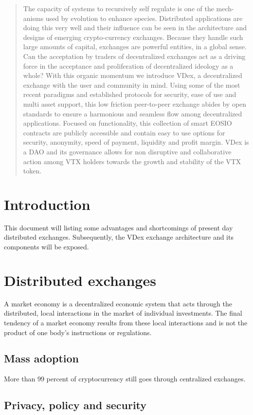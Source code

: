 \documentclass[]{article}
\begin{document}
\begin{abstract}
The capacity of systems to recursively self regulate is one of the mech-
anisms used by evolution to enhance species. Distributed applications are
doing this very well and their influence can be seen in the architecture
and designs of emerging crypto-currency exchanges. Because they handle
such large amounts of capital, exchanges are powerful entities, in a global
sense. Can the acceptation by traders of decentralized exchanges act as a
driving force in the acceptance and proliferation of decentralized ideology
as a whole? 
With this organic momentum we introduce VDex, a decentralized exchange 
with the user and community in mind. Using some of the most recent paradigms 
and established protocols for security, ease of use and multi asset support, 
this low friction peer-to-peer exchange abides by open standards to ensure 
a harmonious and seamless flow among decentralized applications. 
Focused on functionality, this collection of smart EOSIO contracts are 
publicly accessible and contain easy to use options for security, anonymity, 
speed of payment, liquidity and profit margin.
VDex is a DAO and its governance allows for non disruptive and collaborative action among VTX holders towards the growth and stability of the
VTX token.
\end{abstract}
\section{Introduction}
This document will listing some advantages and shortcomings of present 
day distributed exchanges. 
Subsequently, the VDex exchange architecture and its components will be exposed.


\section{Distributed exchanges}
	A market economy is a decentralized economic system that acts through the distributed, 
	local interactions in the market of individual investments. 
	The final tendency of a market economy results from these local 
	interactions and is not the product of one body's instructions or regulations.
	\subsection{Mass adoption}
	More than 99 percent of cryptocurrency still goes through centralized exchanges.
	\subsection{Privacy, policy and security}
\end{document}
